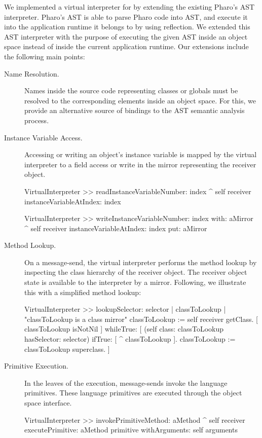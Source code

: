 We implemented a virtual interpreter for \Vtt by extending the existing Pharo's AST interpreter. Pharo's AST is able to parse Pharo code into AST, and execute it into the application runtime it belongs to by using reflection. We extended this AST interpreter with the purpose of executing the given AST inside an object space instead of inside the current application runtime. Our extensions include the following main points:

\begin{description}
\item[Name Resolution.] Names inside the source code representing \eg classes or globals must be resolved to the corresponding elements inside an object space. For this, we provide an alternative source of bindings to the AST semantic analysis process.

\item[Instance Variable Access.] Accessing or writing an object's instance variable is mapped by the virtual interpreter to a field access or write in the mirror representing the receiver object.

\begin{code}
VirtualInterpreter >> readInstanceVariableNumber: index
    ^ self receiver instanceVariableAtIndex: index
    
VirtualInterpreter >> writeInstanceVariableNumber: index with: aMirror
    ^ self receiver instanceVariableAtIndex: index put: aMirror
\end{code}

\item[Method Lookup.] On a message-send, the virtual interpreter performs the method lookup by inspecting the class hierarchy of the receiver object. The receiver object state is available to the interpreter by a mirror. Following, we illustrate this with a simplified method lookup:

\begin{code}
VirtualInterpreter >> lookupSelector: selector
    | classToLookup |
    "classToLookup is a class mirror"
    classToLookup := self receiver getClass.
    [ classToLookup isNotNil ] whileTrue: [
        (self class: classToLookup hasSelector: selector)
        	    ifTrue: [ ^ classToLookup ].
	classToLookup := classToLookup superclass.
    ]
\end{code}

\item[Primitive Execution.] In the leaves of the execution, message-sends invoke the language primitives. These language primitives are executed through the object space interface.

\begin{code}
VirtualInterpreter >> invokePrimitiveMethod: aMethod
    ^ self receiver
         executePrimitive: aMethod primitive
         withArguments: self arguments
\end{code}

\end{description}

